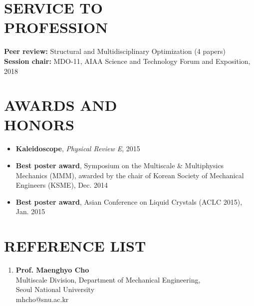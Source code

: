 \documentclass[margin, 10pt]{res} %
\begin{document}
\begin{resume}
\begin{enumerate}
\end{enumerate}

\section{SERVICE TO \\ PROFESSION}

\textbf{Peer review: }
Structural and Multidisciplinary Optimization (4 papers) \\
\textbf{Session chair: }
MDO-11, AIAA Science and Technology Forum and Exposition, 2018
\section{AWARDS AND \\ HONORS}
\begin{itemize}
    \item \textbf{Kaleidoscope}, \textit{Physical Review E}, 2015
    \item \textbf{Best poster award}, Symposium on the Multiscale \& Multiphysics Mechanics (MMM), awarded by the chair of Korean Society of Mechanical Engineers (KSME), Dec. 2014 
    \item \textbf{Best poster award}, Asian Conference on Liquid Crystals (ACLC 2015), Jan. 2015
\end{itemize}
\section{REFERENCE LIST}
\begin{enumerate}
    \item \textbf{Prof. Maenghyo Cho} \\
    Multiscale Division, Department of Mechanical Engineering, \\
    Seoul National University \\
    mhcho@snu.ac.kr \\
    

\end{enumerate}
\end{resume}
\end{document}
